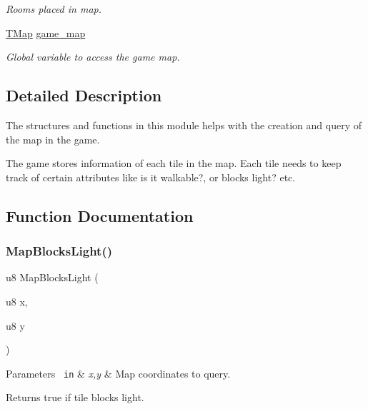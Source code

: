 \begin{DoxyCompactItemize}
\begin{DoxyCompactList}\small\item\em Rooms placed in map. \end{DoxyCompactList}\item 
\mbox{\hyperlink{structTMap}{T\+Map}} \mbox{\hyperlink{group__GameMap_ga6c049bed6e4286fab8db7b65f4d8f871}{game\+\_\+map}}
\begin{DoxyCompactList}\small\item\em Global variable to access the game map. \end{DoxyCompactList}\end{DoxyCompactItemize}


\subsection{Detailed Description}
The structures and functions in this module helps with the creation and query of the map in the game.

The game stores information of each tile in the map. Each tile needs to keep track of certain attributes like is it walkable?, or blocks light? etc. 

\subsection{Function Documentation}
\mbox{\label{group__GameMap_ga4a96cfd7d7f5dab759c0274d498ca927}} 
\subsubsection{\texorpdfstring{MapBlocksLight()}{MapBlocksLight()}}
{\footnotesize\ttfamily u8 Map\+Blocks\+Light (\begin{DoxyParamCaption}\item[{u8}]{x,  }\item[{u8}]{y }\end{DoxyParamCaption})}


\begin{DoxyParams}[1]{Parameters}
\mbox{\texttt{ in}}  & {\em x,y} & Map coordinates to query.\\
\hline
\end{DoxyParams}
\begin{DoxyReturn}{Returns}
true if tile blocks light. 
\end{DoxyReturn}
\mbox{\label{group__GameMap_ga0a25d4a00a01f6a01f415c8cf22b17d2}} 
